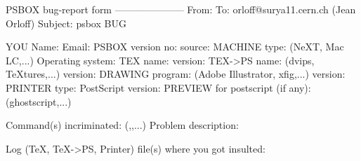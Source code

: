 {{{{{{{{{{{{{{{%
%
%
                   PSBOX bug-report form
                   ---------------------
{}From:
To: orloff@surya11.cern.ch (Jean Orloff)
Subject: psbox BUG

YOU     Name:
        Email:
PSBOX   version no:
        source:
MACHINE type: (NeXT, Mac LC,...)
        Operating system:
TEX     name:
        version:
TEX->PS name: (dvips, TeXtures,...)
        version:
DRAWING program: (Adobe Illustrator, xfig,...)
        version:
PRINTER type:
	PostScript version:
PREVIEW for postscript (if any): (ghostscript,...)

Command(s) incriminated: (\psbox,\splitfile,...)
Problem description:




Log (TeX, TeX->PS, Printer) file(s) where you got insulted:

}}}}}}}}}}}}}}}
